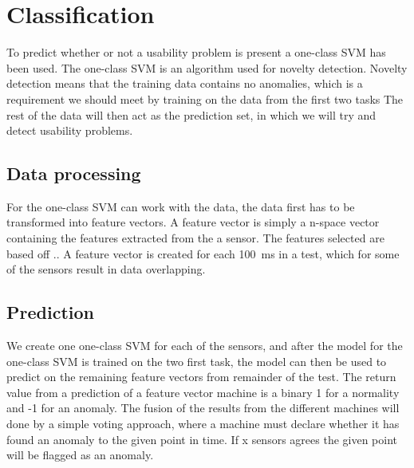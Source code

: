 \section{Classification}
To predict whether or not a usability problem is present a one-class SVM has been used.
The one-class SVM is an algorithm used for novelty detection. Novelty detection means that the training data contains no anomalies, which is a requirement we should meet by training on the data from the first two tasks
The rest of the data will then act as the prediction set, in which we will try and detect usability problems.

\subsection{Data processing}
For the one-class SVM can work with the data, the data first has to be transformed into feature vectors.
A feature vector is simply a n-space vector containing the features extracted from the a sensor.
The features selected are based off .. 
A feature vector is created for each 100~ms in a test, which for some of the sensors result in data overlapping.

\subsection{Prediction}
We create one one-class SVM for each of the sensors, and after the model for the one-class SVM is trained on the two first task, the model can then be used to predict on the remaining feature vectors from remainder of the test.
The return value from a prediction of a feature vector machine is a binary 1 for a normality and -1 for an anomaly.
The fusion of the results from the different machines will done by a simple voting approach, where a machine must declare whether it has found an anomaly to the given point in time. If x sensors agrees the given point will be flagged as an anomaly. 
